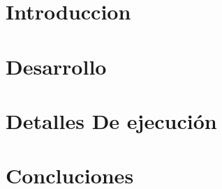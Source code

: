 \documentclass[10pt, a4paper]{article}
\begin{document}


\tableofcontents
\pagebreak
\section{Introduccion}

\section{Desarrollo}

\section{Detalles De ejecución}

\section{Concluciones}

\end{document}
